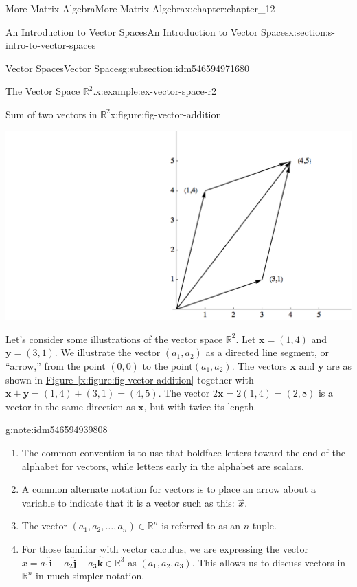 \documentclass[oneside,10pt,]{book}
\newcommand{\xreffont}{\relax}
\numberwithin{equation}{section}
\renewcommand{\vec}[1]{\mathbf{#1}}
\begin{document}
\begin{chapterptx}{More Matrix Algebra}{}{More Matrix Algebra}{}{}{x:chapter:chapter_12}
\begin{sectionptx}{An Introduction to Vector Spaces}{}{An Introduction to Vector Spaces}{}{}{x:section:s-intro-to-vector-spaces}
\begin{subsectionptx}{Vector Spaces}{}{Vector Spaces}{}{}{g:subsection:idm546594971680}
\begin{example}{The Vector Space \(\mathbb{R}^2\).}{x:example:ex-vector-space-r2}
\begin{figureptx}{Sum of two vectors in \(\mathbb{R}^2\)}{x:figure:fig-vector-addition}{}
\begin{image}{0.2}{0.6}{0.2}
\includegraphics[width=\linewidth]{images/fig-vector-addition.png}
\end{image}%
\tcblower
\end{figureptx}%
Let's consider some illustrations of the vector space \(\mathbb{R}^2\). Let  \(\vec{x}= (1, 4)\) and \(\vec{y} = (3, 1)\). We illustrate the vector \(\left(a_1, a_2\right)\) as a directed line segment, or ``arrow,'' from the point \((0, 0)\) to the point\(\left(a_1, a_2\right)\).  The vectors \(\vec{x}\) and \(\vec{y}\) are as shown in \hyperref[x:figure:fig-vector-addition]{Figure~{\xreffont\ref{x:figure:fig-vector-addition}}} together with \(\vec{x}+ \vec{y} = (1, 4) + (3, 1) = (4, 5)\). The vector \(2 \vec{x} = 2(1, 4) = (2, 8)\) is a vector in the same direction as \(\vec{x}\), but with twice its length.%
\end{example}
\begin{note}{}{g:note:idm546594939808}%
%
\begin{enumerate}[label=(\arabic*)]
\item{}The common convention is to use that boldface letters toward the end of the alphabet for vectors, while letters early in the alphabet are scalars.%
\item{}A common alternate notation for vectors is to place an arrow about a variable to indicate that it is a vector such as this:  \(\overset{\rightharpoonup }{x}\).%
\item{}The vector \(\left(a_1,a_2,\ldots ,a_n\right)\in \mathbb{R}^n\) is referred to as an \(n\)-tuple.%
\item{}For those familiar with vector calculus, we are expressing the vector \(x = a_1 \boldsymbol{\hat{\textbf{i}}}+ a_2 \boldsymbol{\hat{\textbf{j}}} + a_3 \boldsymbol{\hat{\textbf{k}}} \in \mathbb{R}^3\) as \(\left(a_1,a_2,a_3\right)\). This allows us to discuss vectors in \(\mathbb{R}^n\) in much simpler notation.%

\end{enumerate}
\end{note}
\end{subsectionptx}
\end{sectionptx}
\end{chapterptx}
\end{document}
